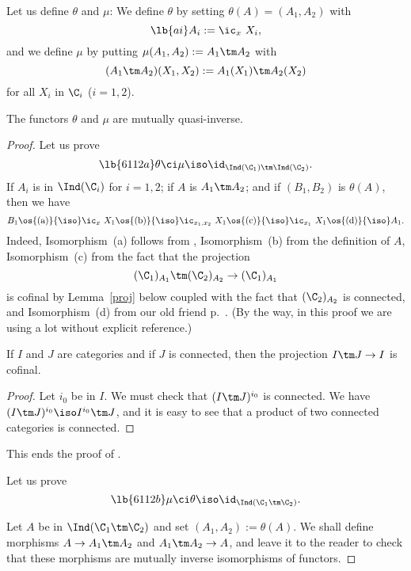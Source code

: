 \documentclass[12pt]{article}
\theoremstyle{remark}
\theoremstyle{definition}
\begin{document}
Let us define $\theta$ and $\mu$: We define $\theta$ by setting $\theta(A)=(A_1,A_2)$ with
\begin{equation}\lb{ai}
A_i:=\ic_x\ X_i, 
\end{equation} 
and we define $\mu$ by putting $\mu(A_1,A_2):=A_1\tm A_2$ with 
$$
(A_1\tm A_2)(X_1,X_2):=A_1(X_1)\tm A_2(X_2)
$$ 
for all $X_i$ in $\C_i$ ($i=1,2$).%

\begin{prop}[Proposition 6.1.12 p.~134]
The functors $\theta$ and $\mu$ are mutually quasi-inverse.
\end{prop}

\begin{proof}
Let us prove
\begin{equation}\lb{6112a}
\theta\ci\mu\iso\id_{\Ind(\C_1)\tm\Ind(\C_2)}.
\end{equation}
If $A_i$ is in $\Ind(\C_i)$ for $i=1,2$; if $A$ is $A_1\tm A_2$; and if $(B_1,B_2)$ is $\theta(A)$, then we have 
$$ 
B_1
\os{\text{(a)}}{\iso}\ic_x\ X_1
\os{\text{(b)}}{\iso}\ic_{x_1,x_2}\ X_1
\os{\text{(c)}}{\iso}\ic_{x_1}\ X_1
\os{\text{(d)}}{\iso}A_1.
$$ 
Indeed, Isomorphism~(a) follows from , Isomorphism~(b) from the definition of $A$, Isomorphism~(c) from the fact that the projection 
$$
(\C_1)_{A_1}\tm(\C_2)_{A_2}\to(\C_1)_{A_1}
$$ 
is cofinal by Lemma~\ref{proj} below coupled with the fact that $(\C_2)_{A_2}$ is connected, and Isomorphism~(d) from our old friend  p.~. (By the way, in this proof we are using  a lot without explicit reference.)

\begin{lem}
If $I$ and $J$ are categories and if $J$ is connected, then the projection $I\tm J\to I$ is cofinal.
\end{lem}

\begin{proof}
Let $i_0$ be in $I$. We must check that $(I\tm J)^{i_0}$ is connected. We have $(I\tm J)^{i_0}\iso I^{i_0}\tm J$, and it is easy to see that a product of two connected categories is connected. 
\end{proof}

This ends the proof of .

Let us prove
\begin{equation}\lb{6112b}
\mu\ci\theta\iso\id_{\Ind(\C_1\tm\C_2)}.
\end{equation}

Let $A$ be in $\Ind(\C_1\tm\C_2)$ and set $(A_1,A_2):=\theta(A)$. We shall define morphisms $A\to A_1\tm A_2$ and $A_1\tm A_2\to A$, and leave it to the reader to check that these morphisms are mutually inverse isomorphisms of functors. 


\end{proof}
\end{document}
